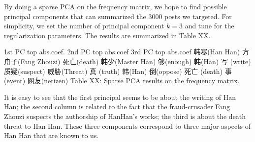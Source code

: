 \documentclass[11pt]{article}
\newcommand{\1}[1]{{\mathbf 1}\left\{#1\right\}}        %
\begin{document}
By doing a sparse PCA on the frequency matrix, we hope to find possible principal components that can summarized the 3000 posts we targeted. For simplicity, we set the number of principal component $k=3$ and tune for the regularization parameters. The results are summarized in Table XX.


1st PC top abs.coef.   2nd PC top abs.coef    3rd PC top abs.coef
     韩寒(Han Han)           方舟子(Fang Zhouzi)     死亡(death)
     韩少(Master Han)         够(enough)              韩(Han)
     写 (write)              质疑(suspect)           威胁(Threat)
     真 (truth)                韩(Han)                倒(oppose)
     死亡 (death)              事(event)             网友(netizen)
Table XX: Sparse PCA results on the frequency matrix.

It is easy to see that the first principal seems to be about the writing of Han Han; the second column is related to the fact that the fraud-crusader Fang Zhouzi suspects the authorship of HanHan's works; the third is about the death threat to Han Han. These three components correspond to three major aspects of Han Han that are known to us. 


\end{document}
